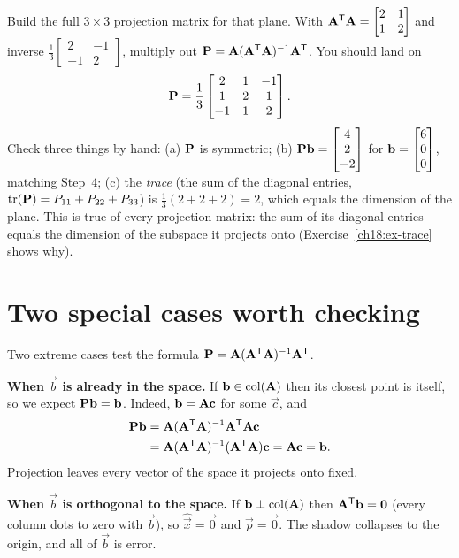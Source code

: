 \begin{labbox}
Build the full $3\times3$ projection matrix for that plane. With
$\mathbf{A}^{\mathsf{T}}\mathbf{A}=\begin{bmatrix}2&1\\1&2\end{bmatrix}$ and inverse
$\frac13\begin{bmatrix}2&-1\\-1&2\end{bmatrix}$, multiply out
$\mathbf{P}=\mathbf{A}(\mathbf{A}^{\mathsf{T}}\mathbf{A})^{-1}\mathbf{A}^{\mathsf{T}}$. You should land on
\[
  \mathbf{P} = \frac{1}{3}\begin{bmatrix} 2 & 1 & -1 \\ 1 & 2 & 1 \\ -1 & 1 & 2 \end{bmatrix}.
\]
Check three things by hand: (a) $\mathbf{P}$ is symmetric; (b) $\mathbf{P}\mathbf{b}=\begin{bmatrix}4\\2\\-2\end{bmatrix}$ for
$\mathbf{b}=\begin{bmatrix}6\\0\\0\end{bmatrix}$, matching Step~4; (c) the \emph{trace} (the sum of the diagonal entries,
$\operatorname{tr}(\mathbf{P}) = P_{11}+P_{22}+P_{33}$) is $\frac13(2+2+2)=2$, which equals the dimension
of the plane. This is true of every projection matrix: the sum of its diagonal entries equals the
dimension of the subspace it projects onto (Exercise~\ref{ch18:ex-trace} shows why).
\end{labbox}

\section{Two special cases worth checking}

Two extreme cases test the formula $\mathbf{P}=\mathbf{A}(\mathbf{A}^{\mathsf{T}}\mathbf{A})^{-1}\mathbf{A}^{\mathsf{T}}$.

\textbf{When $\vec{b}$ is already in the space.} If $\mathbf{b}\in\operatorname{col}(\mathbf{A})$ then its closest point
is itself, so we expect $\mathbf{P}\mathbf{b}=\mathbf{b}$. Indeed, $\mathbf{b}=\mathbf{A}\mathbf{c}$ for some
$\vec{c}$, and
\begin{align*}
  \mathbf{P}\mathbf{b} &= \mathbf{A}(\mathbf{A}^{\mathsf{T}}\mathbf{A})^{-1}\mathbf{A}^{\mathsf{T}}\mathbf{A}\mathbf{c}\\
                 &= \mathbf{A}(\mathbf{A}^{\mathsf{T}}\mathbf{A})^{-1}(\mathbf{A}^{\mathsf{T}}\mathbf{A})\mathbf{c}
                  = \mathbf{A}\mathbf{c} = \mathbf{b}.
\end{align*}
Projection leaves every vector of the space it projects onto fixed.

\textbf{When $\vec{b}$ is orthogonal to the space.} If $\mathbf{b}\perp\operatorname{col}(\mathbf{A})$ then
$\mathbf{A}^{\mathsf{T}}\mathbf{b}=\mathbf{0}$ (every column dots to zero with $\vec{b}$), so $\hat{\vec{x}}=\vec{0}$
and $\vec{p}=\vec{0}$. The shadow collapses to the origin, and all of $\vec{b}$ is error.

